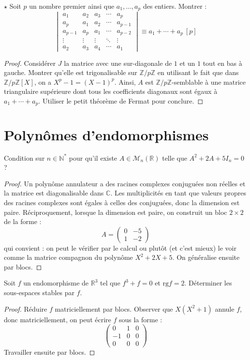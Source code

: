 \documentclass[french,a4paper]{article}
\newcommand{\N}{\mathbb{N}}
\newcommand{\Z}{\mathbb{Z}}
\newcommand{\R}{\mathbb{R}}
\newcommand{\C}{\mathbb{C}}
\newcommand{\st}{^*}
\theoremstyle{plain}
\theoremstyle{definition}
\theoremstyle{remark}
\begin{document}
\begin{ex}[Guindy]{$\star$}
	Soit $p$ un nombre premier ainsi que $a_1,\ldots,a_p$ des entiers. Montrer : $$\begin{vmatrix}
		a_1&a_2&a_3&\cdots&a_p\\
		a_p&a_1&a_2&\cdots&a_{p-1}\\
		a_{p-1}&a_p&a_1&\cdots&a_{p-2}\\
		\vdots&\vdots&\vdots&\ddots&\vdots\\
		a_2&a_3&a_4&\cdots&a_1
	\end{vmatrix}\equiv a_1+\cdots+a_p\ [p]$$
\end{ex}
\begin{proof}
	Considérer $J$ la matrice avec une sur-diagonale de $1$ et un $1$ tout en bas à gauche. Montrer qu'elle est trigonalisable sur $\Z/p\Z$ en utilisant le fait que dans $\Z/p\Z[X]$, on a $X^p-1=(X-1)^p$. Ainsi, $A$ est $\Z/p\Z$-semblable à une matrice triangulaire supérieure dont tous les coefficients diagonaux sont égaux à $a_1+\cdots+a_p$. Utiliser le petit théorème de Fermat pour conclure.
\end{proof}

\section{Polynômes d'endomorphismes}

\begin{ex}{}
	Condition sur $n\in\N\st$ pour qu'il existe $A\in\mathcal{M}_n(\R)$ telle que $A^2+2A+5I_n=0$ ?
\end{ex}
\begin{proof}
	Un polynôme annulateur a des racines complexes conjuguées non réelles et la matrice est diagonalisable dans $\C$. Les multiplicités en tant que valeurs propres des racines complexes sont égales à celles des conjuguées, donc la dimension est paire. Réciproquement, lorsque la dimension est paire, on construit un bloc $2\times 2$ de la forme : $$A=\begin{pmatrix}
		0&-5\\
		1&-2
	\end{pmatrix}$$ qui convient : on peut le vérifier par le calcul ou plutôt (et c'est mieux) le voir comme la matrice compagnon du polynôme $X^2+2X+5$. On généralise ensuite par blocs.
\end{proof}

\begin{ex}{}
	Soit $f$ un endomorphisme de $\R^3$ tel que $f^3+f=0$ et $\text{rg}f=2$. Déterminer les sous-espaces stables par $f$.
\end{ex}
\begin{proof}
	Réduire $f$ matriciellement par blocs. Observer que $X(X^2+1)$ annule $f$, donc matriciellement, on peut écrire $f$ sous la forme : $$\begin{pmatrix}
		0&1&0\\
		-1&0&0\\
		0&0&0
	\end{pmatrix}$$ Travailler ensuite par blocs.
\end{proof}
\end{document}

